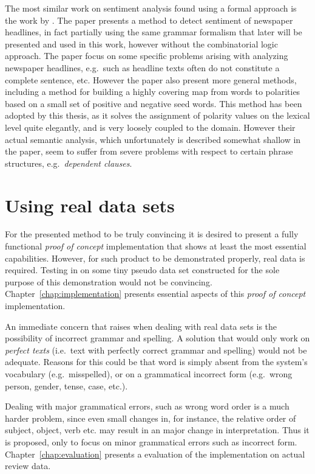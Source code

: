The most similar work on sentiment analysis found using a formal approach is the work by \citeauthor{valenceShifting} . The paper presents a method to detect sentiment of newspaper headlines, in fact partially using the same grammar formalism that later will be presented and used in this work, however without the combinatorial logic approach. The paper focus on some specific problems arising with analyzing newspaper headlines, e.g.\ such as headline texts often do not constitute a complete sentence, etc. However the paper also present more general methods, including a method for building a highly covering map from words to polarities based on a small set of positive and negative seed words. This method has been adopted by this thesis, as it solves the assignment of polarity values on the lexical level quite elegantly, and is very loosely coupled to the domain. However their actual semantic analysis, which unfortunately is described somewhat shallow in the paper, seem to suffer from severe problems with respect to certain phrase structures, e.g.\ \emph{dependent clauses}.


\section{Using real data sets}
\label{sec:realData}

For the presented method to be truly convincing it is desired to present a fully functional \emph{proof of concept} implementation that shows at least the most essential capabilities. However, for such product to be demonstrated properly, real data is required. Testing in on some tiny pseudo data set constructed for the sole purpose of this demonstration would not be convincing. Chapter~\ref{chap:implementation} presents essential aspects of this \emph{proof of concept} implementation. 

An immediate concern that raises when dealing with real data sets is the possibility of incorrect grammar and spelling. A solution that would only work on \emph{perfect texts} (i.e.\ text with perfectly correct grammar and spelling) would not be adequate. %
Reasons for this could be that word is simply absent from the system's vocabulary (e.g.\ misspelled), or on a grammatical incorrect form (e.g.\ wrong person, gender, tense, case, etc.). 

Dealing with major grammatical errors, such as wrong word order is a much harder problem, since even small changes in, for instance, the relative order of subject, object, verb etc. may result in an major change in interpretation. Thus it is proposed, only to focus on minor grammatical errors such as incorrect form. Chapter~\ref{chap:evaluation} presents a evaluation of the implementation on actual review data.

